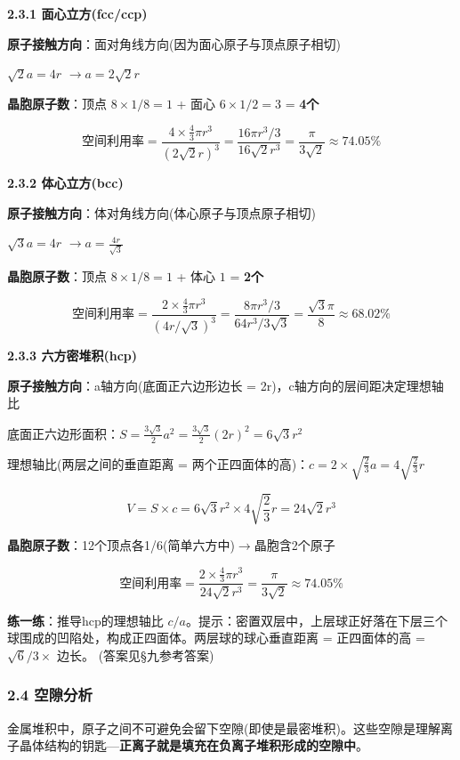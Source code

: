 \documentclass[a4paper,11pt]{ctexart}
\newcommand{\箭}{\ensuremath{\rightarrow}}
\newcommand{\左箭}{\ensuremath{\leftarrow}}
\newcommand{\上箭}{\ensuremath{\uparrow}}
\newcommand{\下箭}{\ensuremath{\downarrow}}
\newcommand{\衡}{\ensuremath{\rightleftharpoons}}
\newcommand{\双箭}{\ensuremath{\leftrightarrow}}
\newcommand{\约等于}{\ensuremath{\approx}}
\newcommand{\小于等于}{\ensuremath{\leq}}
\newcommand{\大于等于}{\ensuremath{\geq}}
\newcommand{\不等于}{\ensuremath{\neq}}
\newcommand{\西格马}{\ensuremath{\sigma}}
\newcommand{\派}{\ensuremath{\pi}}
\begin{document}
\textbf{2.3.1 面心立方(fcc/ccp)}

\textbf{原子接触方向}：面对角线方向(因为面心原子与顶点原子相切)

\(\sqrt{2}a = 4r\) \箭 \(a = 2\sqrt{2}r\)

\textbf{晶胞原子数}：顶点 \(8 \times 1/8 = 1\) + 面心 \(6 \times 1/2 = 3\) = \textbf{4个}

\[
\text{空间利用率} = \frac{4 \times \frac{4}{3}\pi r^3}{(2\sqrt{2}r)^3} = \frac{16\pi r^3 / 3}{16\sqrt{2}r^3} = \frac{\pi}{3\sqrt{2}} \approx 74.05\%
\]

\textbf{2.3.2 体心立方(bcc)}

\textbf{原子接触方向}：体对角线方向(体心原子与顶点原子相切)

\(\sqrt{3}a = 4r\) \箭 \(a = \frac{4r}{\sqrt{3}}\)

\textbf{晶胞原子数}：顶点 \(8 \times 1/8 = 1\) + 体心 \(1\) = \textbf{2个}

\[
\text{空间利用率} = \frac{2 \times \frac{4}{3}\pi r^3}{(4r/\sqrt{3})^3} = \frac{8\pi r^3 / 3}{64r^3 / 3\sqrt{3}} = \frac{\sqrt{3}\pi}{8} \approx 68.02\%
\]

\textbf{2.3.3 六方密堆积(hcp)}

\textbf{原子接触方向}：a轴方向(底面正六边形边长 = 2r)，c轴方向的层间距决定理想轴比

底面正六边形面积：\(S = \frac{3\sqrt{3}}{2}a^2 = \frac{3\sqrt{3}}{2}(2r)^2 = 6\sqrt{3}r^2\)

理想轴比(两层之间的垂直距离 = 两个正四面体的高)：\(c = 2 \times \sqrt{\frac{2}{3}}a = 4\sqrt{\frac{2}{3}}r\)

\[
V = S \times c = 6\sqrt{3}r^2 \times 4\sqrt{\frac{2}{3}}r = 24\sqrt{2}r^3
\]

\textbf{晶胞原子数}：12个顶点各1/6(简单六方中)\箭 晶胞含2个原子

\[
\text{空间利用率} = \frac{2 \times \frac{4}{3}\pi r^3}{24\sqrt{2}r^3} = \frac{\pi}{3\sqrt{2}} \approx 74.05\%
\]

\textbf{练一练}：推导hcp的理想轴比 \(c/a\)。提示：密置双层中，上层球正好落在下层三个球围成的凹陷处，构成正四面体。两层球的球心垂直距离 = 正四面体的高 = \(\sqrt{6}/3 \times\) 边长。
(答案见§九参考答案)

\subsubsection{2.4 空隙分析}\label{ux7a7aux9699ux5206ux6790}

金属堆积中，原子之间不可避免会留下空隙(即使是最密堆积)。这些空隙是理解离子晶体结构的钥匙---\textbf{正离子就是填充在负离子堆积形成的空隙中}。
\end{document}
